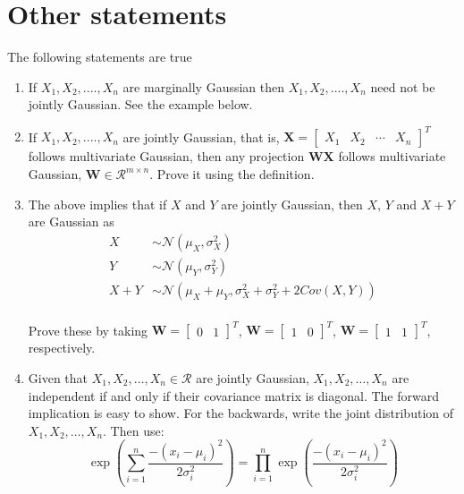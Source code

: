 \documentclass{article}
\begin{document}
\section{Other statements}
The following statements are true
\begin{enumerate}
    \item If $X_1, X_2,....,X_n$ are marginally Gaussian then $X_1, X_2,....,X_n$ need not be jointly Gaussian. See the example below.

    \item If $X_1, X_2,....,X_n$ are jointly Gaussian, that is, $\mathbf{X} =  \begin{bmatrix}X_1 & X_2 & \cdots & X_n\end{bmatrix}^T$ follows multivariate Gaussian, then any projection $\mathbf{WX}$ follows multivariate Gaussian, $\mathbf{W} \in \mathcal{R}^{m \times n}$. Prove it using the definition.

    \item The above implies that if $X$ and $Y$ are jointly Gaussian, then $X$, $Y$ and $X + Y$ are Gaussian as
        \begin{align*}
            X &\sim \mathcal{N}(\mu_X, \sigma^2_X)\\
            Y &\sim \mathcal{N}(\mu_Y, \sigma^2_Y)\\
            X + Y &\sim \mathcal{N}(\mu_X + \mu_Y, \sigma^2_X +  \sigma^2_Y + 2Cov(X, Y) )\\
        \end{align*}

    Prove these by taking $\mathbf{W} = \begin{bmatrix}0 & 1\end{bmatrix}^T$, $\mathbf{W} = \begin{bmatrix}1 & 0\end{bmatrix}^T$, $\mathbf{W} = \begin{bmatrix}1 & 1\end{bmatrix}^T$, respectively.

    \item Given that $X_1, X_2,\dots, X_n \in \mathcal{R}$ are jointly Gaussian,  $X_1, X_2,\dots, X_n$ are independent if and only if their covariance matrix is diagonal. The forward implication is easy to show. For the backwards, write the joint distribution of $X_1, X_2,\dots, X_n$. Then use:
    \begin{equation*}
        \exp({\sum_{i = 1}^{n}\frac{-(x_i - \mu_i)^2}{2\sigma_i^2}}) =  \prod_{i = 1}^{n}\exp({\frac{-(x_i - \mu_i)^2}{2\sigma_i^2}})
        \end{equation*}
\end{enumerate}
\end{document}
